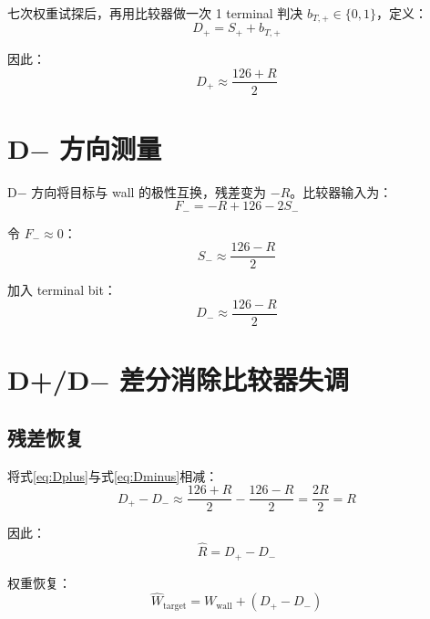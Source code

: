 \documentclass[
  UTF8,
  a4paper,
  11pt,
  oneside,
  fontset=fandol
]{ctexrep}
\newcommand{\What}{\widehat{W}}
\newcommand{\Rhat}{\widehat{R}}
\begin{document}
七次权重试探后，再用比较器做一次 \SI{1}{\LSB} terminal 判决 $b_{T,+} \in \{0,1\}$，定义：
\begin{equation}
D_+ = S_+ + b_{T,+}
\end{equation}

因此：
\begin{equation}
\boxed{D_+ \approx \frac{126 + R}{2}}
\label{eq:Dplus}
\end{equation}

\chapter{D$-$ 方向测量}

D$-$ 方向将目标与 wall 的极性互换，残差变为 $-R$。比较器输入为：
\begin{equation}
\boxed{F_- = -R + 126 - 2S_-}
\label{eq:Fminus}
\end{equation}

令 $F_- \approx 0$：
\begin{equation}
S_- \approx \frac{126 - R}{2}
\end{equation}

加入 terminal bit：
\begin{equation}
\boxed{D_- \approx \frac{126 - R}{2}}
\label{eq:Dminus}
\end{equation}

\chapter{D+/D$-$ 差分消除比较器失调}

\section{残差恢复}

将式\eqref{eq:Dplus}与式\eqref{eq:Dminus}相减：
\begin{equation}
D_+ - D_- \approx \frac{126 + R}{2} - \frac{126 - R}{2} = \frac{2R}{2} = R
\end{equation}

因此：
\begin{equation}
\boxed{\Rhat = D_+ - D_-}
\label{eq:Rhat}
\end{equation}

权重恢复：
\begin{equation}
\boxed{\What_{\mathrm{target}} = W_{\mathrm{wall}} + (D_+ - D_-)}
\label{eq:What_target}
\end{equation}
\end{document}
